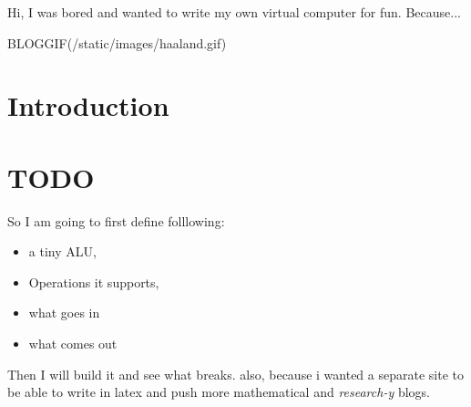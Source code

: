 Hi, I was bored and wanted to write my own virtual computer for fun. Because...

BLOGGIF(/static/images/haaland.gif)

\section{Introduction}

\section{TODO}

So I am going to first define folllowing:

\begin{itemize}
    \item a tiny ALU,
    \item Operations it supports,
    \item what goes in
    \item what comes out
\end{itemize}

Then I will build it and see what breaks.
also, because i wanted a separate site to be able to write in latex and push more mathematical
and \textit{research-y} blogs.
